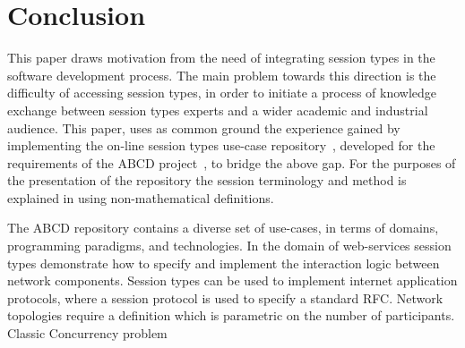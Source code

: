 \section{Conclusion}
\label{sec:conclusion}

This paper draws motivation from the need
of integrating session types in the software
development process. The main problem towards
this direction is the difficulty of accessing
session types, in order to initiate a process
of knowledge exchange between session types
experts and a wider academic and industrial
audience. This paper, uses as common ground
the experience gained by implementing
the on-line session types use-case
repository~\cite{usecases_repository}, developed for the
requirements of the ABCD project~\cite{ABCD},
to bridge the above gap. For the purposes of
the presentation of the repository the session terminology
and method is explained in using non-mathematical
definitions.

The ABCD repository contains a 
diverse set of use-cases, in terms of domains,
programming paradigms, and technologies.
In the domain of web-services session types
demonstrate how to specify and implement
the interaction logic between network components.
Session types can be used to implement internet
application protocols, where a session protocol
is used to specify a standard RFC. Network topologies
require a definition which is parametric on the number
of participants. Classic Concurrency problem